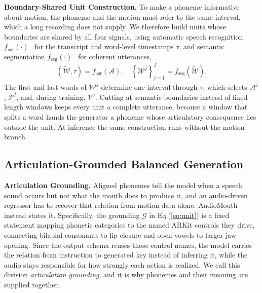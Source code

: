 \noindent\textbf{Boundary-Shared Unit Construction.}\quad
To make a phoneme informative about motion, the phoneme and the motion must refer to the same interval, which a long recording does not supply. We therefore build units whose boundaries are shared by all four signals, using automatic speech recognition $f_{\mathrm{asr}}(\cdot)$~\citep{gao2023funasr,zhang2022paddlespeech} for the transcript and word-level timestamps $\tau$, and semantic segmentation $f_{\mathrm{seg}}(\cdot)$~\citep{frohmann2024segment} for coherent utterances,
\begin{gather}
    \left(\tilde{\mathcal{W}},\tau\right)=f_{\mathrm{asr}}\!\left(\mathcal{A}\right),\quad
    \left\{\mathcal{W}^{j}\right\}_{j=1}^{J}=f_{\mathrm{seg}}\!\left(\tilde{\mathcal{W}}\right). \label{eq:seg}
\end{gather}
The first and last words of $\mathcal{W}^{j}$ determine one interval through $\tau$, which selects $\mathcal{A}^{j}$, $\mathcal{P}^{j}$, and, during training, $\mathcal{V}^{j}$. Cutting at semantic boundaries instead of fixed-length windows keeps every unit a complete utterance, because a window that splits a word hands the generator a phoneme whose articulatory consequence lies outside the unit. At inference the same construction runs without the motion branch.

\subsection{Articulation-Grounded Balanced Generation}
\label{sec:stage2}

\noindent\textbf{Articulation Grounding.}\quad
Aligned phonemes tell the model when a speech sound occurs but not what the mouth does to produce it, and an audio-driven regressor has to recover that relation from motion data alone. AudioMouth instead states it. Specifically, the grounding $\mathcal{G}$ in Eq.(\ref{eq:unit}) is a fixed statement mapping phonetic categories to the named ARKit controls they drive, connecting bilabial consonants to lip closure and open vowels to larger jaw opening. Since the output schema reuses those control names, the model carries the relation from instruction to generated key instead of inferring it, while the audio stays responsible for how strongly each action is realized. We call this division \emph{articulation grounding}, and it is why phonemes and their meaning are supplied together.

